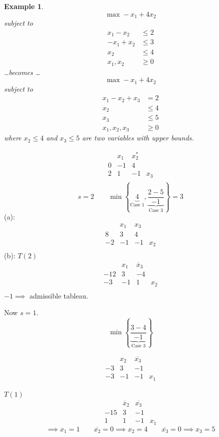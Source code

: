 \documentclass[a4paper]{article}
\numberwithin{lecref}{section}
\newcounter{exercises}
\newtheorem{example}[exercises]{Example}
\newcommand{\Set}[1]{\left\{#1\right\}}
\begin{document}
\begin{description}
		\begin{example}
			\[ \max -x_1 + 4x_2 \]
			subject to
			\begin{align*}
				x_1 - x_2 &\leq 2 \\
				-x_1 + x_2 &\leq 3 \\
				x_2 &\leq 4 \\
				x_1, x_2 &\geq 0
			\end{align*}
			\dots becomes \dots
			\[ \max -x_1 + 4x_2 \]
			subject to
			\begin{align*}
				x_1 - x_2 + x_3 &= 2 \\
				x_2 &\leq 4 \\
				x_3 &\leq 5 \\
				x_1, x_2, x_3 &\geq 0
			\end{align*}
			where $x_2 \leq 4$ and $x_3 \leq 5$ are two variables with upper bounds.
		\end{example}

		\begin{center}
			\[\begin{array}{c|ccc}
				  & x_1 & x_2^* & \\
				0 & -1 & 4 & \\
			\hline
				2 & 1 & -1 & x_3 \\
			\end{array}\]
			\[ s = 2 \qquad \min\Set{\underbrace{4}_{\text{Case 1}}, \underbrace{\frac{2 - 5}{-1}}_{\text{Case 3}}} = 3 \]
			(a):
			\[\begin{array}{c|ccc}
				  & x_1 & x_3 \\
				8 & 3 & 4 & \\
			\hline
				-2 & -1 & -1 & x_2 \\
			\end{array}\]
			(b): $T(2)$
			\[\begin{array}{c|ccc}
				  & x_1 & \overline x_3 \\
				-12 & 3 & -4 & \\
			\hline
				-3 & -1 & 1 & x_2 \\
			\end{array}\]
			$-1 \implies$ admissible tableau.

			Now $s = 1$.
			\[ \min\Set{\underbrace{\frac{3-4}{-1}}_{\text{Case 3}}} \]

			\[\begin{array}{c|ccc}
				   & x_2 & \overline{x_3} & \\
				-3 & 3 & -1 & \\
			\hline
				-3 & -1 & -1 & x_1
			\end{array}\]

			$T(1)$
			\[\begin{array}{c|ccc}
				    & \overline x_2 & \overline{x_3} & \\
				-15 & 3 & -1 & \\
			\hline
				1 & 1 & -1 & x_1
			\end{array}\]
			\[ \implies x_1 = 1 \qquad \overline{x_2} = 0 \implies x_2 = 4 \qquad \overline{x_3} = 0 \implies x_3 = 5 \]
		\end{center}
\end{description}
\end{document}
